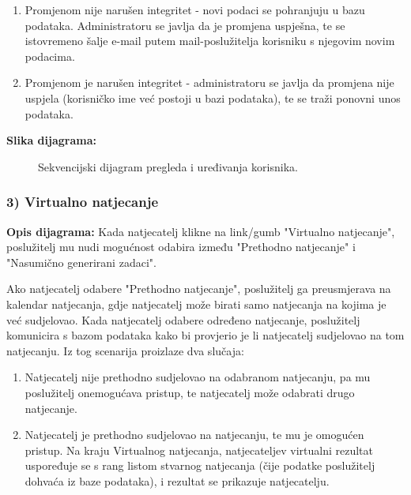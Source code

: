 				\begin{enumerate}
					    \item Promjenom nije narušen integritet - novi podaci se pohranjuju u bazu podataka. Administratoru se javlja da je promjena uspješna, te se istovremeno šalje e-mail putem mail-poslužitelja korisniku s njegovim novim podacima.
					\item Promjenom je narušen integritet - administratoru se javlja da promjena nije uspjela (korisničko ime već postoji u bazi podataka), te se traži ponovni unos podataka.
					\end{enumerate}
					
					\textbf{Slika dijagrama:}
					\begin{figure}[H]
					\centering

					\caption{Sekvencijski dijagram pregleda i uređivanja korisnika.}
					\end{figure}
					
					\subsubsection{3) Virtualno natjecanje}
					
					\textbf{Opis dijagrama:}
					Kada natjecatelj klikne na link/gumb "Virtualno natjecanje", poslužitelj mu nudi mogućnost odabira između "Prethodno natjecanje" i "Nasumično generirani zadaci".
					
					Ako natjecatelj odabere "Prethodno natjecanje", poslužitelj ga preusmjerava na kalendar natjecanja, gdje natjecatelj može birati samo natjecanja na kojima je već sudjelovao. Kada natjecatelj odabere određeno natjecanje, poslužitelj komunicira s bazom podataka kako bi provjerio je li natjecatelj sudjelovao na tom natjecanju. Iz tog scenarija proizlaze dva slučaja:
					
					\begin{enumerate}
					\item Natjecatelj nije prethodno sudjelovao na odabranom natjecanju, pa mu poslužitelj onemogućava pristup, te natjecatelj može odabrati drugo natjecanje.
					\item Natjecatelj je prethodno sudjelovao na natjecanju, te mu je omogućen pristup. Na kraju Virtualnog natjecanja, natjecateljev virtualni rezultat uspoređuje se s rang listom stvarnog natjecanja (čije podatke poslužitelj dohvaća iz baze podataka), i rezultat se prikazuje natjecatelju.
					\end{enumerate}
					
